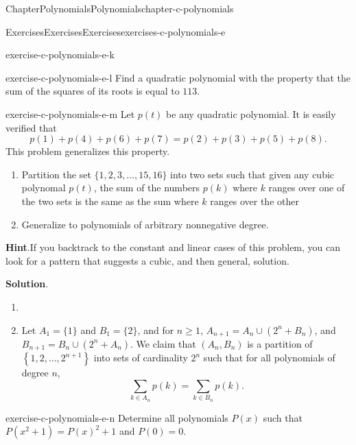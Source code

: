 \documentclass[oneside,10pt,]{book}
\newcommand{\blocktitlefont}{\relax}
\numberwithin{equation}{section}
\begin{document}
\begin{chapterptx}{Chapter}{Polynomials}{}{Polynomials}{}{}{chapter-c-polynomials}
\begin{exercises-section}{Exercises}{Exercises}{}{Exercises}{}{}{exercises-c-polynomials-e}
\begin{divisionexercise}{10}{}{}{exercise-c-polynomials-e-k}
\end{divisionexercise}%
\begin{divisionexercise}{11}{}{}{exercise-c-polynomials-e-l}%
Find a quadratic polynomial with the property that the sum of the squares of its roots is equal to \(113\).%
\end{divisionexercise}%
\begin{divisionexercise}{12}{}{}{exercise-c-polynomials-e-m}%
Let \(p(t)\) be any quadratic polynomial.  It is easily verified that%
\begin{equation*}
p(1)+p(4)+p(6)+p(7) = p(2)+p(3)+p(5)+p(8).
\end{equation*}
This problem generalizes this property.%
\begin{enumerate}[label=(\alph*)]
\item{}Partition the set \(\{1, 2, 3, \dots , 15, 16\}\) into two sets such that given any cubic polynomal \(p(t)\), the sum of the numbers \(p(k)\) where \(k\) ranges over one of  the two sets is the same as the sum where \(k\) ranges over the other%
\item{}Generalize to polynomials of arbitrary nonnegative degree.%
\end{enumerate}
%
\par\smallskip%
\noindent\textbf{\blocktitlefont Hint}.\hypertarget{hint-c-polynomials-e-m-b}{}\quad{}If you backtrack to the constant and linear cases of this problem, you can look for a pattern that suggests a cubic, and then general, solution.%
\par\smallskip%
\noindent\textbf{\blocktitlefont Solution}.\hypertarget{solution-c-polynomials-e-m-c}{}\quad{}%
\begin{enumerate}[label=(\alph*)]
\item{}%
\item{}Let \(A_1=\{1\}\) and \(B_1= \{2\}\), and for \(n \geq 1\), \(A_{n+1}=A_{n }\cup \left(2^n+B_n\right)\), and \(B_{n+1}=B_{n }\cup \left(2^n+A_n\right)\).  We claim that  \(\left(A_n, B_n\right)\)  is a partition of \(\left\{1,2,\ldots  ,2^{n+1}\right\}\) into sets  of cardinality \(2^n\) such that for all polynomials of degree \(n\),%
\begin{equation*}
\sum _{k\in A_n} p(k)=\sum _{k\in B_n} p(k).
\end{equation*}
%
\end{enumerate}
%
\end{divisionexercise}%
\begin{divisionexercise}{13}{}{}{exercise-c-polynomials-e-n}%
Determine all polynomials \(P(x)\) such that \(P\left(x^2+1\right)=P(x)^2+1\) and \(P(0)=0\).%

\end{divisionexercise}
\end{exercises-section}
\end{chapterptx}
\end{document}
